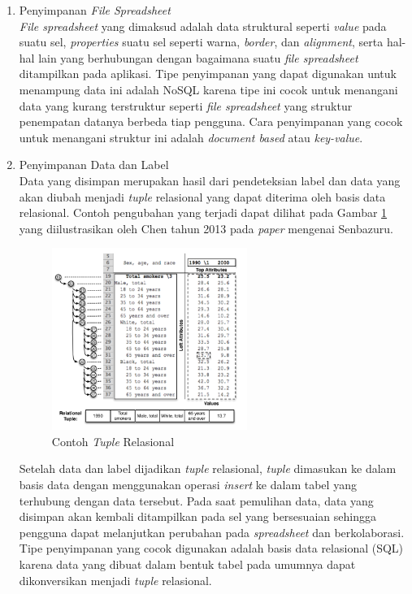 \begin{enumerate}
	\item Penyimpanan \textit{File Spreadsheet} \\
	\textit{File spreadsheet} yang dimaksud adalah data struktural seperti \textit{value} pada suatu sel, \textit{properties} suatu sel seperti warna, \textit{border}, dan \textit{alignment}, serta hal-hal lain yang berhubungan dengan bagaimana suatu \textit{file spreadsheet} ditampilkan pada aplikasi. Tipe penyimpanan yang dapat digunakan untuk menampung data ini adalah NoSQL karena tipe ini cocok untuk menangani data yang kurang terstruktur seperti \textit{file spreadsheet} yang struktur penempatan datanya berbeda tiap pengguna. Cara penyimpanan yang cocok untuk menangani struktur ini adalah \textit{document based} atau \textit{key-value}.

	\item Penyimpanan Data dan Label \\
	Data yang disimpan merupakan hasil dari pendeteksian label dan data yang akan diubah menjadi \textit{tuple} relasional yang dapat diterima oleh basis data relasional. Contoh pengubahan yang terjadi dapat dilihat pada Gambar \ref{RelationalTuple} yang diilustrasikan oleh Chen tahun 2013 pada \textit{paper} mengenai Senbazuru.

	\begin{figure}[htb]
	    \centering
	    \includegraphics[width=0.6\textwidth]{resources/chapter-3-relational-tuple.png}
	    \caption{Contoh \textit{Tuple} Relasional \citep{Chen2013}}
		\label{RelationalTuple}
	\end{figure}

	Setelah data dan label dijadikan \textit{tuple} relasional, \textit{tuple} dimasukan ke dalam basis data dengan menggunakan operasi \textit{insert} ke dalam tabel yang terhubung dengan data tersebut. Pada saat pemulihan data, data yang disimpan akan kembali ditampilkan pada sel yang bersesuaian sehingga pengguna dapat melanjutkan perubahan pada \textit{spreadsheet} dan berkolaborasi. Tipe penyimpanan yang cocok digunakan adalah basis data relasional (SQL) karena data yang dibuat dalam bentuk tabel pada umumnya dapat dikonversikan menjadi \textit{tuple} relasional.
\end{enumerate}

